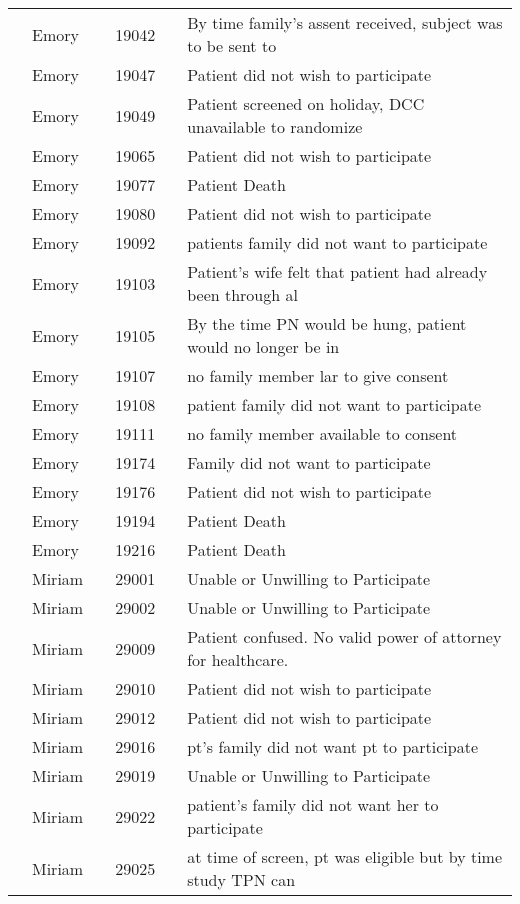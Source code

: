 \documentclass[dvips,10pt]{article}
\begin{document}
\begin{table}[t]
\begin{center}
\begin{tabular}{ @{}l@{}
@{}l@{}@{}p{1.5em}@{}@{}c@{}@{}p{1.5em}@{}@{}l@{}
}
\\
& Emory && 19042 && By time family's assent received, subject was to be sent to \\
& Emory && 19047 && Patient did not wish to participate \\
& Emory && 19049 && Patient screened on holiday, DCC unavailable to randomize \\
& Emory && 19065 && Patient did not wish to participate \\
& Emory && 19077 && Patient Death \\
& Emory && 19080 && Patient did not wish to participate \\
& Emory && 19092 && patients family did not want to participate \\
& Emory && 19103 && Patient's wife felt that patient had already been through al \\
& Emory && 19105 && By the time PN would be hung, patient would no longer be in \\
& Emory && 19107 && no family member lar to give consent \\
& Emory && 19108 && patient family did not want to participate \\
& Emory && 19111 && no family member available to consent \\
& Emory && 19174 && Family did not want to participate \\
& Emory && 19176 && Patient did not wish to participate \\
& Emory && 19194 && Patient Death \\
& Emory && 19216 && Patient Death \\
& Miriam && 29001 && Unable or Unwilling to Participate \\
& Miriam && 29002 && Unable or Unwilling to Participate \\
& Miriam && 29009 && Patient confused. No valid power of attorney for healthcare. \\
& Miriam && 29010 && Patient did not wish to participate \\
& Miriam && 29012 && Patient did not wish to participate \\
& Miriam && 29016 && pt's family did not want pt to participate \\
& Miriam && 29019 && Unable or Unwilling to Participate \\
& Miriam && 29022 && patient's family did not want her to participate \\
& Miriam && 29025 && at time of screen, pt was eligible but by time study TPN can \\

\end{tabular}
\end{center}
\end{table}
\end{document}
